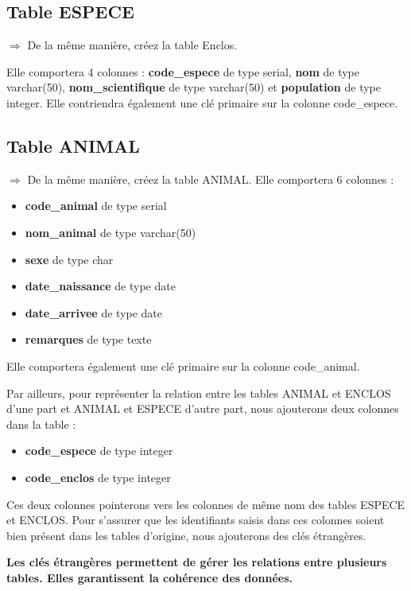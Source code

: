 \documentclass[11pt]{article}
\begin{document}
			\subsection{Table ESPECE}
				$\Rightarrow$ De la même manière, créez la table Enclos. 
				
				Elle comportera 4 colonnes : \textbf{code\_espece} de type serial, \textbf{nom} de type varchar(50), \textbf{nom\_scientifique} de type varchar(50) et \textbf{population} de type integer. Elle contriendra également une clé primaire sur la colonne code\_espece.
			
			
			\subsection{Table ANIMAL}
				$\Rightarrow$ De la même manière, créez la table ANIMAL. Elle comportera 6 colonnes :
				\begin{itemize}
					\item \textbf{code\_animal} de type serial
					\item \textbf{nom\_animal} de type varchar(50) 
					\item \textbf{sexe} de type char
					\item \textbf{date\_naissance} de type date
					\item \textbf{date\_arrivee} de type date
					\item \textbf{remarques} de type texte
				\end{itemize}
				
				Elle comportera également une clé primaire sur la colonne code\_animal.
				
				Par ailleurs, pour représenter la relation entre les tables ANIMAL et ENCLOS d'une part et ANIMAL et ESPECE d'autre part, nous ajouterons deux colonnes dans la table :
				\begin{itemize}
					\item \textbf{code\_espece} de type integer
					\item \textbf{code\_enclos} de type integer
				\end{itemize}
				
				Ces deux colonnes pointerons vers les colonnes de même nom des tables ESPECE et ENCLOS. Pour s'assurer que les identifiants saisis dans ces colonnes soient bien présent dans les tables d'origine, nous ajouterons des clés étrangères.
				
				\textbf{Les clés étrangères permettent de gérer les relations entre plusieurs tables. Elles garantissent la cohérence des données.}
\end{document}
